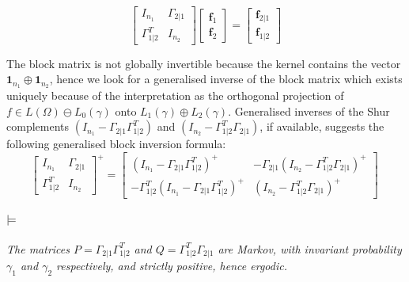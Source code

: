 \documentclass[runningheads]{llncs}
\begin{document}
\begin{equation}
\label{eq:block}
  \begin{bmatrix}
    I_{n_1} & \Gamma_{2|1} \\ \Gamma_{1|2}^T & I_{n_2}
  \end{bmatrix}
  \begin{bmatrix}
    \bm f_1 \\ \bm f_2
  \end{bmatrix}
=
\begin{bmatrix}
  \bm f_{2|1} \\ \bm f_{1|2}
\end{bmatrix}
\end{equation}

The block matrix is not globally invertible because the kernel contains the vector $\bm 1 _{n_1} \oplus \bm 1_{n_2}$, hence we look for a generalised inverse of the block matrix  which  exists uniquely because of the interpretation as the orthogonal projection of $f \in L(\Omega) \ominus L_0(\gamma)$ onto $L_1(\gamma)\oplus L_2(\gamma)$. Generalised inverses of the Shur complements $(I_{n_1}-\Gamma_{2|1}\Gamma_{1|2}^T)$ and $(I_{n_2}-\Gamma_{1|2}^T\Gamma_{2|1})$, if available, suggests the following generalised block inversion formula:
%
\begin{equation}
\label{eq:blocksolve}
\begin{bmatrix}
    I_{n_1} & \Gamma_{2|1} \\ \Gamma_{1|2}^T & I_{n_2}
  \end{bmatrix} ^+ =
  \begin{bmatrix}
    (I_{n_1}-\Gamma_{2|1}\Gamma_{1|2}^T)^{+} & - \Gamma_{2|1} (I_{n_2}-\Gamma_{1|2}^T\Gamma_{2|1})^{+} \\
 - \Gamma_{1|2}^T (I_{n_1}-\Gamma_{2|1}\Gamma_{1|2}^T)^{+} & (I_{n_2}-\Gamma_{1|2}^T\Gamma_{2|1})^{+} 
\end{bmatrix} \ 
\end{equation}

\paragraph{$\bf\models$} \emph{The matrices $P = \Gamma_{2|1}\Gamma_{1|2}^T$ and $Q = \Gamma_{1|2}^T\Gamma_{2|1}$ are Markov, with invariant probability $\gamma_1$ and $\gamma_2$ respectively, and strictly positive, hence ergodic.}
\end{document}
